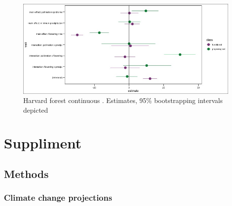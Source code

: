 \documentclass[12pt]{article}\usepackage[]{graphicx}\usepackage[]{color}
\begin{document}
     \begin{figure}
    \centering
    \includegraphics[width=\textwidth]{..//figure/HF_cont_effectsize.jpeg}
    \caption{Harvard forest continuous . Estimates, 95\% bootstrapping intervals depicted}
    \label{fig:Figure 6}
    \end{figure}

\pagebreak


\section*{Suppliment}
\subsection*{Methods}
\subsubsection*{Climate change projections}
\end{document}
